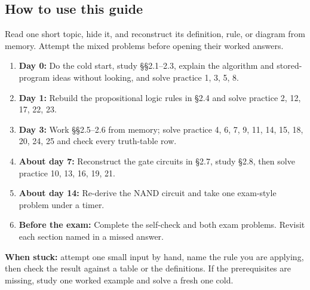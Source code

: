 \documentclass[11pt]{article}
\begin{document}
\begin{keepsection}
\section{How to use this guide}

Read one short topic, hide it, and reconstruct its definition, rule, or diagram from memory. Attempt the mixed problems before opening their worked answers.

\begin{enumerate}
\item \textbf{Day 0:} Do the cold start, study §§2.1–2.3, explain the algorithm and stored-program ideas without looking, and solve practice 1, 3, 5, 8.
\item \textbf{Day 1:} Rebuild the propositional logic rules in §2.4 and solve practice 2, 12, 17, 22, 23.
\item \textbf{Day 3:} Work §§2.5–2.6 from memory; solve practice 4, 6, 7, 9, 11, 14, 15, 18, 20, 24, 25 and check every truth-table row.
\item \textbf{About day 7:} Reconstruct the gate circuits in §2.7, study §2.8, then solve practice 10, 13, 16, 19, 21.
\item \textbf{About day 14:} Re-derive the NAND circuit and take one exam-style problem under a timer.
\item \textbf{Before the exam:} Complete the self-check and both exam problems. Revisit each section named in a missed answer.
\end{enumerate}

\begin{notebox}\textbf{When stuck:} attempt one small input by hand, name the rule you are applying, then check the result against a table or the definitions. If the prerequisites are missing, study one worked example and solve a fresh one cold.\end{notebox}
\end{keepsection}
\end{document}

